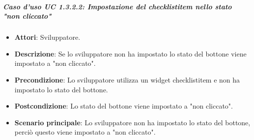 \subparagraph{Caso d'uso UC 1.3.2.2: Impostazione del checklistitem nello stato "non cliccato"}
\label{UC 1.3.2.2: Impostazione del bottone nello stato "non cliccato"}

\FloatBarrier
\begin{itemize}
\item\textbf{Attori}: Sviluppatore.
\item\textbf{Descrizione}: Se lo sviluppatore non ha impostato lo stato del bottone viene impostato a "non cliccato".
\item\textbf{Precondizione}: Lo sviluppatore utilizza un widget checklistitem e non ha impostato lo stato del bottone.
\item\textbf{Postcondizione}: Lo stato del bottone viene impostato a "non cliccato".
\item\textbf{Scenario principale}: Lo sviluppatore non ha impostato lo stato del bottone, perciò questo viene impostato a "non cliccato".
\end{itemize}
